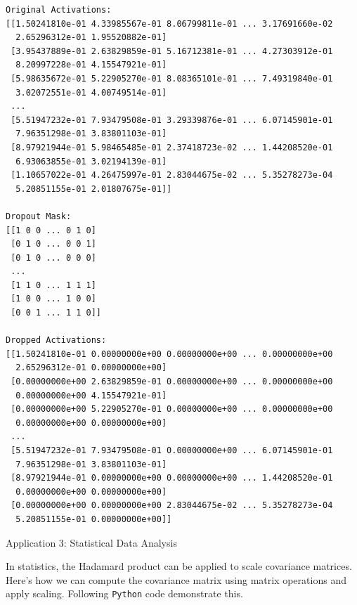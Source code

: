 \documentclass[
  letterpaper,
  DIV=11,
  numbers=noendperiod]{scrreprt}
\theoremstyle{plain}
\theoremstyle{definition}
\theoremstyle{remark}
\begin{document}
\begin{verbatim}
Original Activations:
[[1.50241810e-01 4.33985567e-01 8.06799811e-01 ... 3.17691660e-02
  2.65296312e-01 1.95520882e-01]
 [3.95437889e-01 2.63829859e-01 5.16712381e-01 ... 4.27303912e-01
  8.20997228e-01 4.15547921e-01]
 [5.98635672e-01 5.22905270e-01 8.08365101e-01 ... 7.49319840e-01
  3.02072551e-01 4.00749514e-01]
 ...
 [5.51947232e-01 7.93479508e-01 3.29339876e-01 ... 6.07145901e-01
  7.96351298e-01 3.83801103e-01]
 [8.97921944e-01 5.98465485e-01 2.37418723e-02 ... 1.44208520e-01
  6.93063855e-01 3.02194139e-01]
 [1.10657022e-01 4.26475997e-01 2.83044675e-02 ... 5.35278273e-04
  5.20851155e-01 2.01807675e-01]]

Dropout Mask:
[[1 0 0 ... 0 1 0]
 [0 1 0 ... 0 0 1]
 [0 1 0 ... 0 0 0]
 ...
 [1 1 0 ... 1 1 1]
 [1 0 0 ... 1 0 0]
 [0 0 1 ... 1 1 0]]

Dropped Activations:
[[1.50241810e-01 0.00000000e+00 0.00000000e+00 ... 0.00000000e+00
  2.65296312e-01 0.00000000e+00]
 [0.00000000e+00 2.63829859e-01 0.00000000e+00 ... 0.00000000e+00
  0.00000000e+00 4.15547921e-01]
 [0.00000000e+00 5.22905270e-01 0.00000000e+00 ... 0.00000000e+00
  0.00000000e+00 0.00000000e+00]
 ...
 [5.51947232e-01 7.93479508e-01 0.00000000e+00 ... 6.07145901e-01
  7.96351298e-01 3.83801103e-01]
 [8.97921944e-01 0.00000000e+00 0.00000000e+00 ... 1.44208520e-01
  0.00000000e+00 0.00000000e+00]
 [0.00000000e+00 0.00000000e+00 2.83044675e-02 ... 5.35278273e-04
  5.20851155e-01 0.00000000e+00]]
\end{verbatim}

Application 3: Statistical Data Analysis

In statistics, the Hadamard product can be applied to scale covariance
matrices. Here's how we can compute the covariance matrix using matrix
operations and apply scaling. Following \texttt{Python} code demonstrate
this.
\end{document}
